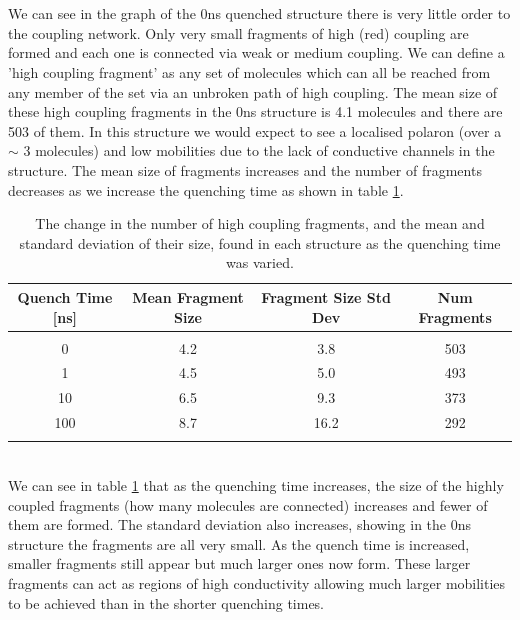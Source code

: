 \\\\
We can see in the graph of the 0ns quenched structure there is very little order to the coupling network. Only very small fragments of high (red) coupling are formed and each one is connected via weak or medium coupling. We can define a 'high coupling fragment' as any set of molecules which can all be reached from any member of the set via an unbroken path of high coupling. The mean size of these high coupling fragments in the 0ns structure is 4.1 molecules and there are 503 of them. In this structure we would expect to see a localised polaron (over a $\sim$ 3 molecules) and low mobilities due to the lack of conductive channels in the structure. The mean size of fragments increases and the number of fragments decreases as we increase the quenching time as shown in table \ref{tab:cluster_sizes}.
\\
\begin{table}[ht]
	\begin{tabular}{cccc}
		\textbf{Quench Time} [ns] & \textbf{Mean Fragment Size} & \textbf{Fragment Size Std Dev} & \textbf{Num Fragments} \\
		\hline &&&\\
		0 & 4.2 & 3.8 & 503 \\
		1 & 4.5 & 5.0 & 493 \\
		10 & 6.5 & 9.3 & 373 \\
		100 & 8.7 & 16.2 & 292 \\
		\hline &&&\\
	\end{tabular}
	\caption{\label{tab:cluster_sizes}The change in the number of high coupling fragments, and the mean and standard deviation of their size, found in each structure as the quenching time was varied.}
\end{table}
\\
We can see in table \ref{tab:cluster_sizes} that as the quenching time increases, the size of the highly coupled fragments (how many molecules are connected) increases and fewer of them are formed. The standard deviation also increases, showing in the 0ns structure the fragments are all very small. As the quench time is increased, smaller fragments still appear but much larger ones now form. These larger fragments can act as regions of high conductivity allowing much larger mobilities to be achieved than in the shorter quenching times.

